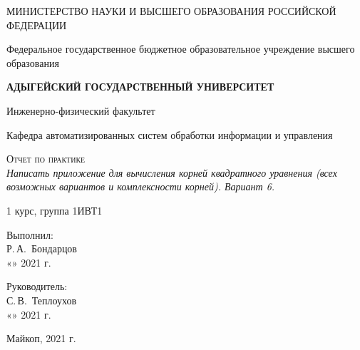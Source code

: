 \documentclass[12pt,a4paper]{scrartcl}
\begin{document}
	\begin{titlepage}
		\begin{center}
			\large
			МИНИСТЕРСТВО НАУКИ И ВЫСШЕГО ОБРАЗОВАНИЯ РОССИЙСКОЙ ФЕДЕРАЦИИ
			
			Федеральное государственное бюджетное образовательное учреждение высшего образования
			
			\textbf{АДЫГЕЙСКИЙ ГОСУДАРСТВЕННЫЙ УНИВЕРСИТЕТ}
			\vspace{0.25cm}
			
			Инженерно-физический факультет
			
			Кафедра автоматизированных систем обработки информации и управления
			\vfill

			\vfill
			
			\textsc{Отчет по практике}\\[5mm]
			
			{\LARGE \textit{Написать приложение для вычисления корней квадратного уравнения (всех возможных вариантов и комплексности корней). Вариант 6.}}
			\bigskip
			
			1 курс, группа 1ИВТ1
		\end{center}
		\vfill
		
		\newlength{\ML}
		\hfill\begin{minipage}{0.5\textwidth}
			Выполнил:\\
			\underline{\hspace{\ML}} Р.\,А.~Бондарцов\\
			«\underline{\hspace{0.7cm}}» \underline{\hspace{2cm}} 2021 г.
		\end{minipage}%
		\bigskip
		
		\hfill\begin{minipage}{0.5\textwidth}
			Руководитель:\\
			\underline{\hspace{\ML}} С.\,В.~Теплоухов\\
			«\underline{\hspace{0.7cm}}» \underline{\hspace{2cm}} 2021 г.
		\end{minipage}%
		\vfill
		
		\begin{center}
			Майкоп, 2021 г.
		\end{center}
	\end{titlepage}
\end{document}
